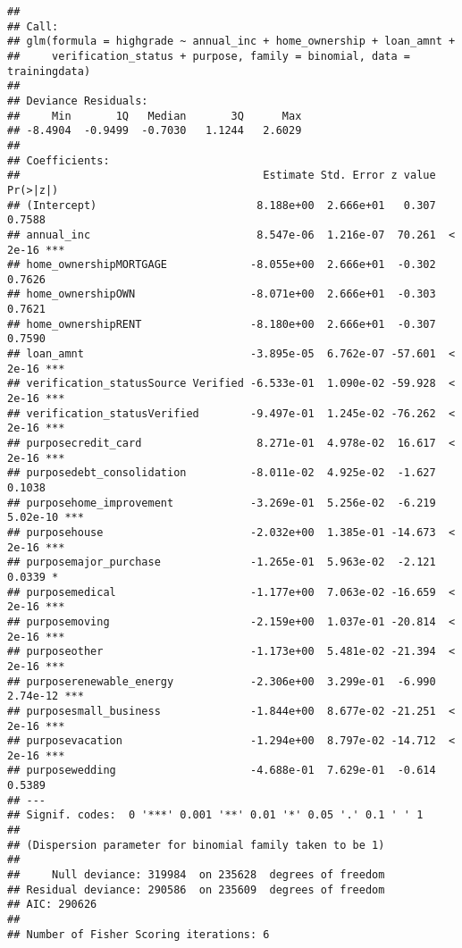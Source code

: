 \documentclass[
]{article}
\begin{document}
\begin{verbatim}
## 
## Call:
## glm(formula = highgrade ~ annual_inc + home_ownership + loan_amnt + 
##     verification_status + purpose, family = binomial, data = trainingdata)
## 
## Deviance Residuals: 
##     Min       1Q   Median       3Q      Max  
## -8.4904  -0.9499  -0.7030   1.1244   2.6029  
## 
## Coefficients:
##                                      Estimate Std. Error z value Pr(>|z|)    
## (Intercept)                         8.188e+00  2.666e+01   0.307   0.7588    
## annual_inc                          8.547e-06  1.216e-07  70.261  < 2e-16 ***
## home_ownershipMORTGAGE             -8.055e+00  2.666e+01  -0.302   0.7626    
## home_ownershipOWN                  -8.071e+00  2.666e+01  -0.303   0.7621    
## home_ownershipRENT                 -8.180e+00  2.666e+01  -0.307   0.7590    
## loan_amnt                          -3.895e-05  6.762e-07 -57.601  < 2e-16 ***
## verification_statusSource Verified -6.533e-01  1.090e-02 -59.928  < 2e-16 ***
## verification_statusVerified        -9.497e-01  1.245e-02 -76.262  < 2e-16 ***
## purposecredit_card                  8.271e-01  4.978e-02  16.617  < 2e-16 ***
## purposedebt_consolidation          -8.011e-02  4.925e-02  -1.627   0.1038    
## purposehome_improvement            -3.269e-01  5.256e-02  -6.219 5.02e-10 ***
## purposehouse                       -2.032e+00  1.385e-01 -14.673  < 2e-16 ***
## purposemajor_purchase              -1.265e-01  5.963e-02  -2.121   0.0339 *  
## purposemedical                     -1.177e+00  7.063e-02 -16.659  < 2e-16 ***
## purposemoving                      -2.159e+00  1.037e-01 -20.814  < 2e-16 ***
## purposeother                       -1.173e+00  5.481e-02 -21.394  < 2e-16 ***
## purposerenewable_energy            -2.306e+00  3.299e-01  -6.990 2.74e-12 ***
## purposesmall_business              -1.844e+00  8.677e-02 -21.251  < 2e-16 ***
## purposevacation                    -1.294e+00  8.797e-02 -14.712  < 2e-16 ***
## purposewedding                     -4.688e-01  7.629e-01  -0.614   0.5389    
## ---
## Signif. codes:  0 '***' 0.001 '**' 0.01 '*' 0.05 '.' 0.1 ' ' 1
## 
## (Dispersion parameter for binomial family taken to be 1)
## 
##     Null deviance: 319984  on 235628  degrees of freedom
## Residual deviance: 290586  on 235609  degrees of freedom
## AIC: 290626
## 
## Number of Fisher Scoring iterations: 6
\end{verbatim}
\end{document}
